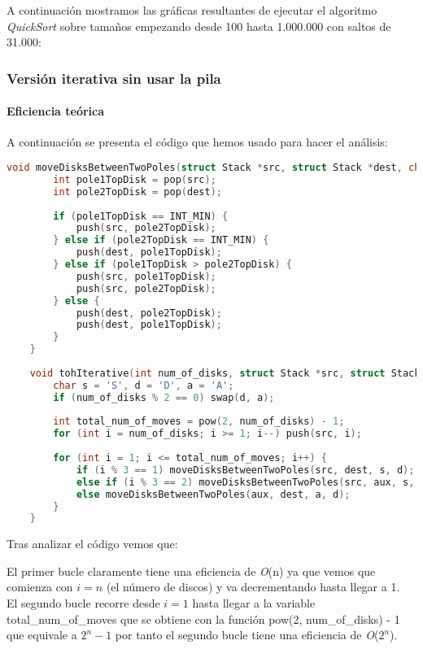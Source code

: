 \documentclass[a4paper,12pt]{article} %
\begin{document}
A continuación mostramos las gráficas resultantes de ejecutar el algoritmo \textit{QuickSort} 
sobre tamaños empezando desde 100 hasta 1.000.000 con saltos de 31.000:

\subsubsection{Versión iterativa sin usar la pila}

\paragraph{Eficiencia teórica}

A continuación se presenta el código que hemos usado para hacer el análisis:

\begin{lstlisting}[language=C, caption={Código de Hanoi Iterativo sin pila}]
	void moveDisksBetweenTwoPoles(struct Stack *src, struct Stack *dest, char s, char d) {
		int pole1TopDisk = pop(src);
		int pole2TopDisk = pop(dest);
	
		if (pole1TopDisk == INT_MIN) {
			push(src, pole2TopDisk);
		} else if (pole2TopDisk == INT_MIN) {
			push(dest, pole1TopDisk);
		} else if (pole1TopDisk > pole2TopDisk) {
			push(src, pole1TopDisk);
			push(src, pole2TopDisk);
		} else {
			push(dest, pole2TopDisk);
			push(dest, pole1TopDisk);
		}
	}
	
	void tohIterative(int num_of_disks, struct Stack *src, struct Stack *aux, struct Stack *dest) {
		char s = 'S', d = 'D', a = 'A';
		if (num_of_disks % 2 == 0) swap(d, a);
	
		int total_num_of_moves = pow(2, num_of_disks) - 1;
		for (int i = num_of_disks; i >= 1; i--) push(src, i);
	
		for (int i = 1; i <= total_num_of_moves; i++) {
			if (i % 3 == 1) moveDisksBetweenTwoPoles(src, dest, s, d);
			else if (i % 3 == 2) moveDisksBetweenTwoPoles(src, aux, s, a);
			else moveDisksBetweenTwoPoles(aux, dest, a, d);
		}
	}
\end{lstlisting}

Tras analizar el código vemos que:

El primer bucle claramente tiene una eficiencia de \textit{O}(n) ya que vemos que comienza con $i=n$ (el número de discos)
y va decrementando hasta llegar a 1.\\

El segundo bucle recorre desde $i=1$ hasta llegar a la variable total\_num\_of\_moves que se obtiene con la función 
pow(2, num\_of\_disks) - 1 que equivale a $2^n - 1$ por tanto el segundo bucle tiene una eficiencia de \textit{O}($2^n$).\\
\end{document}
